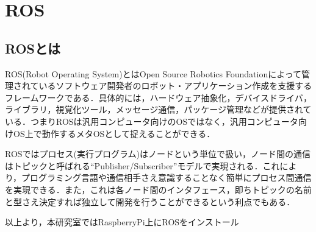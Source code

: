 \documentclass[10pt,a4j]{jarticle}
\begin{document}
\section{ROS}
\subsection{ROSとは}
ROS(Robot Operating System)とはOpen Source Robotics Foundationによって管理されているソフトウェア開発者のロボット・アプリケーション作成を支援するフレームワークである．具体的には，ハードウェア抽象化，デバイスドライバ，ライブラリ，視覚化ツール，メッセージ通信，パッケージ管理などが提供されている．つまりROSは汎用コンピュータ向けのOSではなく，汎用コンピュータ向けOS上で動作するメタOSとして捉えることができる．

ROSではプロセス(実行プログラム)はノードという単位で扱い，ノード間の通信はトピックと呼ばれる``Publisher/Subscriber''モデルで実現される．これにより，プログラミング言語や通信相手さえ意識することなく簡単にプロセス間通信を実現できる．また，これは各ノード間のインタフェース，即ちトピックの名前と型さえ決定すれば独立して開発を行うことができるという利点でもある．

以上より，本研究室ではRaspberryPi上にROSをインストール
\end{document}
